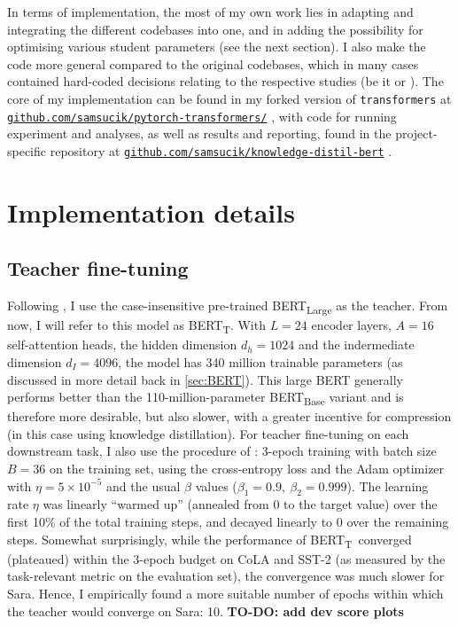 \documentclass[bsc,frontabs,twoside,singlespacing,parskip,deptreport]{infthesis}
\def\BERTT{BERT\textsubscript{T}}
\newcommand\rurl[1]{%
  \href{https://#1}{\nolinkurl{#1}}%
}
\begin{document}
{{    In terms of implementation, the most of my own work lies in adapting and integrating the different codebases into one, and in adding the possibility for optimising various student parameters (see the next section). I also make the code more general compared to the original codebases, which in many cases contained hard-coded decisions relating to the respective studies (be it \citeauthor{Sanh_2019} or \citeauthor{Tang_2019b}). The core of my implementation can be found in my forked version of \verb|transformers| at \rurl{github.com/samsucik/pytorch-transformers/}, with code for running experiment and analyses, as well as results and reporting, found in the project-specific repository at \rurl{github.com/samsucik/knowledge-distil-bert}.
  }

  \section{Implementation details}{
    \subsection{Teacher fine-tuning}{
      Following \citet{Tang_2019b}, I use the case-insensitive pre-trained BERT\textsubscript{Large} as the teacher. 
      From now, I will refer to this model as \BERTT.
      With $L=24$ encoder layers, $A=16$ self-attention heads, the hidden dimension $d_h=1024$ and the indermediate dimension $d_I=4096$, the model has 340 million trainable parameters (as discussed in more detail back in \autoref{sec:BERT}).
      This large BERT generally performs better than the 110-million-parameter BERT\textsubscript{Base} variant and is therefore more desirable, but also slower, with a greater incentive for compression (in this case using knowledge distillation).
      For teacher fine-tuning on each downstream task, I also use the procedure of \citeauthor{Tang_2019b}:
      3-epoch training with batch size $B=36$ on the training set, using the cross-entropy loss and the Adam optimizer with $\eta=5\times10^{-5}$ and the usual $\beta$ values ($\beta_1=0.9,\ \beta_2=0.999$).
      The learning rate $\eta$ was linearly ``warmed up'' (annealed from 0 to the target value) over the first 10\% of the total training steps, and decayed linearly to 0 over the remaining steps.
      Somewhat surprisingly, while the performance of \BERTT~converged (plateaued) within the 3-epoch budget on CoLA and SST-2 (as measured by the task-relevant metric on the evaluation set), the convergence was much slower for Sara. Hence, I empirically found a more suitable number of epochs within which the teacher would converge on Sara: 10. 
      \textbf{TO-DO: add dev score plots}
    }

}}
\end{document}

